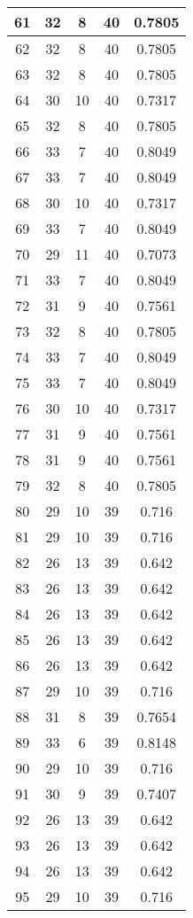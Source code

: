 \documentclass[letterpaper, 12pt]{article}
\begin{document}
\begin{longtable}{|c|c|c|c|c|}
61 & 32 & 8 & 40 & 0.7805 \\
\hline
62 & 32 & 8 & 40 & 0.7805 \\
\hline
63 & 32 & 8 & 40 & 0.7805 \\
\hline
64 & 30 & 10 & 40 & 0.7317 \\
\hline
65 & 32 & 8 & 40 & 0.7805 \\
\hline
66 & 33 & 7 & 40 & 0.8049 \\
\hline
67 & 33 & 7 & 40 & 0.8049 \\
\hline
68 & 30 & 10 & 40 & 0.7317 \\
\hline
69 & 33 & 7 & 40 & 0.8049 \\
\hline
70 & 29 & 11 & 40 & 0.7073 \\
\hline
71 & 33 & 7 & 40 & 0.8049 \\
\hline
72 & 31 & 9 & 40 & 0.7561 \\
\hline
73 & 32 & 8 & 40 & 0.7805 \\
\hline
74 & 33 & 7 & 40 & 0.8049 \\
\hline
75 & 33 & 7 & 40 & 0.8049 \\
\hline
76 & 30 & 10 & 40 & 0.7317 \\
\hline
77 & 31 & 9 & 40 & 0.7561 \\
\hline
78 & 31 & 9 & 40 & 0.7561 \\
\hline
79 & 32 & 8 & 40 & 0.7805 \\
\hline
80 & 29 & 10 & 39 & 0.716 \\
\hline
81 & 29 & 10 & 39 & 0.716 \\
\hline
82 & 26 & 13 & 39 & 0.642 \\
\hline
83 & 26 & 13 & 39 & 0.642 \\
\hline
84 & 26 & 13 & 39 & 0.642 \\
\hline
85 & 26 & 13 & 39 & 0.642 \\
\hline
86 & 26 & 13 & 39 & 0.642 \\
\hline
87 & 29 & 10 & 39 & 0.716 \\
\hline
88 & 31 & 8 & 39 & 0.7654 \\
\hline
89 & 33 & 6 & 39 & 0.8148 \\
\hline
90 & 29 & 10 & 39 & 0.716 \\
\hline
91 & 30 & 9 & 39 & 0.7407 \\
\hline
92 & 26 & 13 & 39 & 0.642 \\
\hline
93 & 26 & 13 & 39 & 0.642 \\
\hline
94 & 26 & 13 & 39 & 0.642 \\
\hline
95 & 29 & 10 & 39 & 0.716 \\

\end{longtable}
\end{document}
